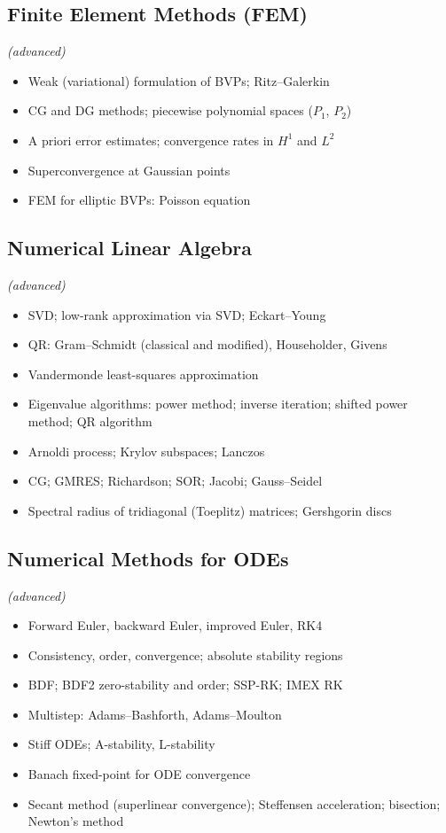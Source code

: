 \subsection{Finite Element Methods (FEM)} \textit{(advanced)}

\begin{itemize}
  \item Weak (variational) formulation of BVPs; Ritz--Galerkin
  \item CG and DG methods; piecewise polynomial spaces ($P_1$, $P_2$)
  \item A priori error estimates; convergence rates in $H^1$ and $L^2$
  \item Superconvergence at Gaussian points
  \item FEM for elliptic BVPs: Poisson equation
\end{itemize}

\subsection{Numerical Linear Algebra} \textit{(advanced)}

\begin{itemize}
  \item SVD; low-rank approximation via SVD; Eckart--Young
  \item QR: Gram--Schmidt (classical and modified), Householder, Givens
  \item Vandermonde least-squares approximation
  \item Eigenvalue algorithms: power method; inverse iteration; shifted power method; QR algorithm
  \item Arnoldi process; Krylov subspaces; Lanczos
  \item CG; GMRES; Richardson; SOR; Jacobi; Gauss--Seidel
  \item Spectral radius of tridiagonal (Toeplitz) matrices; Gershgorin discs
\end{itemize}

\subsection{Numerical Methods for ODEs} \textit{(advanced)}

\begin{itemize}
  \item Forward Euler, backward Euler, improved Euler, RK4
  \item Consistency, order, convergence; absolute stability regions
  \item BDF; BDF2 zero-stability and order; SSP-RK; IMEX RK
  \item Multistep: Adams--Bashforth, Adams--Moulton
  \item Stiff ODEs; A-stability, L-stability
  \item Banach fixed-point for ODE convergence
  \item Secant method (superlinear convergence); Steffensen acceleration; bisection; Newton's method
\end{itemize}

